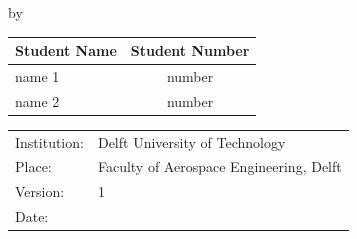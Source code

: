 \begin{titlepage}

\begin{center}

{\makeatletter
\largetitlestyle\fontsize{45}{45}\selectfont\@title
\makeatother}

{\makeatletter
\ifdefvoid{\@subtitle}{}{\titlestyle\fontsize{20}{20}\selectfont\@subtitle}
\makeatother}

\bigskip
\bigskip

by

\bigskip
\bigskip

{\makeatletter
\largetitlestyle\fontsize{25}{25}\selectfont\@author
\makeatother}

\bigskip
\bigskip

\setlength\extrarowheight{2pt}
\begin{tabular}{lc}
    Student Name & Student Number \\\hline
    name 1 & number \\ 
    name 2 & number \\
\end{tabular}

\vfill

\begin{tabular}{ll}
    Institution: & Delft University of Technology \\
    Place: & Faculty of Aerospace Engineering, Delft \\
    Version: & 1 \\
    Date: & 
\end{tabular}

\end{center}


\end{titlepage}
